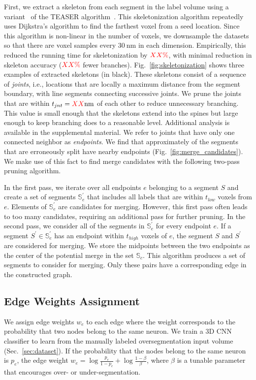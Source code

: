 First, we extract a skeleton from each segment in the label volume using a variant~\cite{zhao2014automatic} of the TEASER algorithm~\cite{sato2000teasar}. 
This skeletonization algorithm repeatedly uses Dijkstra's algorithm to find the farthest voxel from a seed location. 
Since this algorithm is non-linear in the number of voxels, we downsample the datasets so that there are voxel samples every $\SI{30}{\nano\meter}$ in each dimension.
Empirically, this reduced the running time for skeletonization by $\textcolor{red}{XX\%}$, with minimal reduction in skeleton accuracy ($\textcolor{red}{XX\%}$ fewer branches). 
Fig.~\ref{fig:skeletonization} shows three examples of extracted skeletons (in black). 
These skeletons consist of a sequence of \textit{joints}, i.e., locations that are locally a maximum distance from the segment boundary, with line segments connecting successive joints. 
We prune the joints that are within $t_{jnt} = \textcolor{red}{XX}\SI{}{\nano\meter}$ of each other to reduce unnecessary branching.
This value is small enough that the skeletons extend into the spines but large enough to keep branching does to a reasonable level.
Additional analysis is available in the supplemental material.
We refer to joints that have only one connected neighbor as \textit{endpoints}. 
We find that approximately  of the segments that are erroneously split have nearby endpoints  (Fig.~\ref{fig:merge_candidates}). 
We make use of this fact to find merge candidates with the following two-pass pruning algorithm.

In the first pass, we iterate over all endpoints $e$ belonging to a segment $S$ and create a set of segments $\mathbb{S}_e^\prime$ that includes all labels that are within $t_{low}$ voxels from $e$.
Elements of $\mathbb{S}_e^\prime$ are candidates for merging. 
However, this first pass often leads to too many candidates, requiring an additional pass for further pruning. 
In the second pass, we consider all of the segments in $\mathbb{S}_e^\prime$ for every endpoint $e$. 
If a segment $S^\prime \in \mathbb{S}_e^\prime$ has an endpoint within $t_{high}$ voxels of $e$, the segment $S$ and $S^\prime$ are considered for merging. 
We store the midpoints between the two endpoints as the center of the potential merge in the set $\mathbb{S}_c$. 
This algorithm produces a set of segments to consider for merging. Only these pairs have a corresponding edge in the constructed graph.

\subsection{Edge Weights Assignment}
\label{sec:edge-weights}
We assign edge weights $w_e$ to each edge where the weight corresponds to the probability that two nodes belong to the same neuron.
We train a 3D CNN classifier to learn from the manually labeled oversegmentation input volume (Sec.~\ref{sec:dataset}).
If the probability that the nodes belong to the same neuron is $p_e$, the edge weight $w_e = \log{\frac{p_e}{1 - p_e}} + \log{\frac{1 - \beta}{\beta}}$, where $\beta$ is a tunable parameter that encourages over- or under-segmentation.

